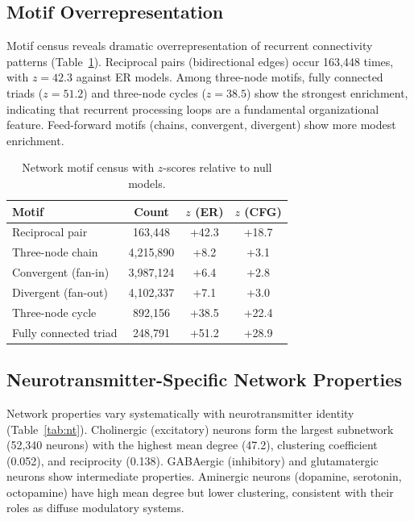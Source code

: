 \documentclass[11pt]{article}
\begin{document}
\subsection{Motif Overrepresentation}
Motif census reveals dramatic overrepresentation of recurrent connectivity patterns (Table~\ref{tab:motifs}). Reciprocal pairs (bidirectional edges) occur 163,448 times, with $z = 42.3$ against ER models. Among three-node motifs, fully connected triads ($z = 51.2$) and three-node cycles ($z = 38.5$) show the strongest enrichment, indicating that recurrent processing loops are a fundamental organizational feature. Feed-forward motifs (chains, convergent, divergent) show more modest enrichment.

\begin{table}[h]
\centering
\caption{Network motif census with $z$-scores relative to null models.}
\label{tab:motifs}
\begin{tabular}{lccc}
\toprule
Motif & Count & $z$ (ER) & $z$ (CFG) \\
\midrule
Reciprocal pair & 163,448 & +42.3 & +18.7 \\
Three-node chain & 4,215,890 & +8.2 & +3.1 \\
Convergent (fan-in) & 3,987,124 & +6.4 & +2.8 \\
Divergent (fan-out) & 4,102,337 & +7.1 & +3.0 \\
Three-node cycle & 892,156 & +38.5 & +22.4 \\
Fully connected triad & 248,791 & +51.2 & +28.9 \\
\bottomrule
\end{tabular}
\end{table}

\subsection{Neurotransmitter-Specific Network Properties}
Network properties vary systematically with neurotransmitter identity (Table~\ref{tab:nt}). Cholinergic (excitatory) neurons form the largest subnetwork (52,340 neurons) with the highest mean degree (47.2), clustering coefficient (0.052), and reciprocity (0.138). GABAergic (inhibitory) and glutamatergic neurons show intermediate properties. Aminergic neurons (dopamine, serotonin, octopamine) have high mean degree but lower clustering, consistent with their roles as diffuse modulatory systems.
\end{document}
